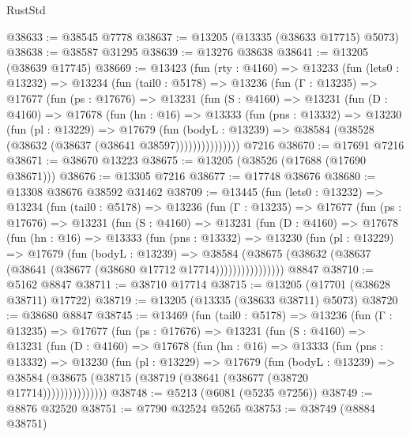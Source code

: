 \begin{lexlean}{RustStd}
\begin{coremodule}
@38633 := @38545 @7778
@38637 := @13205 (@13335 (@38633 @17715) @5073)
@38638 := @38587 @31295
@38639 := @13276 @38638
@38641 := @13205 (@38639 @17745)
@38669 := @13423
    (fun (rty : @4160) =>
    @13233
      (fun (lets0 : @13232) =>
      @13234
        (fun (tail0 : @5178) =>
        @13236
          (fun (Γ : @13235) =>
          @17677
            (fun (ps : @17676) =>
            @13231
              (fun (S : @4160) =>
              @13231
                (fun (D : @4160) =>
                @17678
                  (fun (hn : @16) =>
                  @13333
                    (fun (pns : @13332) =>
                    @13230
                      (fun (pl : @13229) =>
                      @17679
                        (fun (bodyL : @13239) =>
                        @38584 (@38528 (@38632 (@38637 (@38641 @38597)))))))))))))))
    @7216
@38670 := @17691 @7216
@38671 := @38670 @13223
@38675 := @13205 (@38526 (@17688 (@17690 @38671)))
@38676 := @13305 @7216
@38677 := @17748 @38676
@38680 := @13308 @38676 @38592 @31462
@38709 := @13445
    (fun (lets0 : @13232) =>
    @13234
      (fun (tail0 : @5178) =>
      @13236
        (fun (Γ : @13235) =>
        @17677
          (fun (ps : @17676) =>
          @13231
            (fun (S : @4160) =>
            @13231
              (fun (D : @4160) =>
              @17678
                (fun (hn : @16) =>
                @13333
                  (fun (pns : @13332) =>
                  @13230
                    (fun (pl : @13229) =>
                    @17679
                      (fun (bodyL : @13239) =>
                      @38584
                        (@38675
                          (@38632 (@38637 (@38641 (@38677 (@38680 @17712 @17714))))))))))))))))
    @8847
@38710 := @5162 @8847
@38711 := @38710 @17714
@38715 := @13205 (@17701 (@38628 @38711) @17722)
@38719 := @13205 (@13335 (@38633 @38711) @5073)
@38720 := @38680 @8847
@38745 := @13469
    (fun (tail0 : @5178) =>
    @13236
      (fun (Γ : @13235) =>
      @17677
        (fun (ps : @17676) =>
        @13231
          (fun (S : @4160) =>
          @13231
            (fun (D : @4160) =>
            @17678
              (fun (hn : @16) =>
              @13333
                (fun (pns : @13332) =>
                @13230
                  (fun (pl : @13229) =>
                  @17679
                    (fun (bodyL : @13239) =>
                    @38584 (@38675 (@38715 (@38719 (@38641 (@38677 (@38720 @17714)))))))))))))))
@38748 := @5213 (@6081 (@5235 @7256))
@38749 := @8876 @32520
@38751 := @7790 @32524 @5265
@38753 := @38749 (@8884 @38751)

\end{coremodule}
\end{lexlean}
